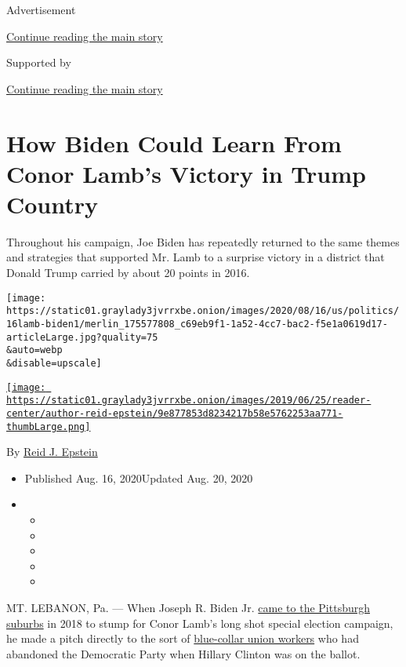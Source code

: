 Advertisement

\protect\hyperlink{after-top}{Continue reading the main story}

Supported by

\protect\hyperlink{after-sponsor}{Continue reading the main story}

\hypertarget{how-biden-could-learn-from-conor-lambs-victory-in-trump-country}{%
\section{How Biden Could Learn From Conor Lamb's Victory in Trump
Country}\label{how-biden-could-learn-from-conor-lambs-victory-in-trump-country}}

Throughout his campaign, Joe Biden has repeatedly returned to the same
themes and strategies that supported Mr. Lamb to a surprise victory in a
district that Donald Trump carried by about 20 points in 2016.

\texttt{[image: https://static01.graylady3jvrrxbe.onion/images/2020/08/16/us/politics/16lamb-biden1/merlin\_175577808\_c69eb9f1-1a52-4cc7-bac2-f5e1a0619d17-articleLarge.jpg?quality=75\\\&auto=webp\\\&disable=upscale]}

\href{https://www.nytimes3xbfgragh.onion/by/reid-j-epstein}{\texttt{[image: https://static01.graylady3jvrrxbe.onion/images/2019/06/25/reader-center/author-reid-epstein/9e877853d8234217b58e5762253aa771-thumbLarge.png]}}

By \href{https://www.nytimes3xbfgragh.onion/by/reid-j-epstein}{Reid J.
Epstein}

\begin{itemize}
\item
  Published Aug. 16, 2020Updated Aug. 20, 2020
\item
  \begin{itemize}
  \item
  \item
  \item
  \item
  \item
  \end{itemize}
\end{itemize}

MT. LEBANON, Pa. --- When Joseph R. Biden Jr.
\href{https://www.c-span.org/video/?442166-1/vice-president-biden-campaigns-conor-lamb-pennsylvania}{came
to the Pittsburgh suburbs} in 2018 to stump for Conor Lamb's long shot
special election campaign, he made a pitch directly to the sort of
\href{https://www.nytimes3xbfgragh.onion/2018/03/11/us/pennsylvania-conor-lamb-unions.html}{blue-collar
union workers} who had abandoned the Democratic Party when Hillary
Clinton was on the ballot.

